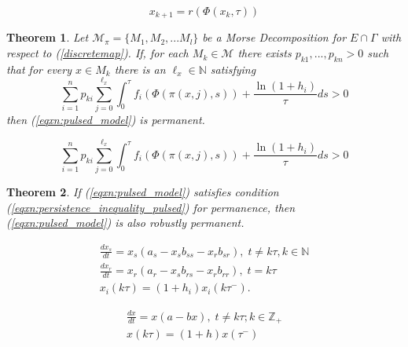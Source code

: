 \documentclass[10pt,a4paper]{amsart}
\newtheorem{theorem}{Theorem}
\newcommand{\N}{{\mathbb{N}}}
\newcommand{\Z}{{\mathbb{Z}}}
\begin{document}
\begin{equation}\label{discretemap}
x_{k+1}= r(\Phi(x_k, \tau))   
\end{equation}

\begin{theorem} \label{thm:main}
  Let $\mathcal{M}_\pi = \{M_1, M_2,... M_l\}$ be a Morse Decomposition for $E \cap \Gamma$ with respect to (\ref{discretemap}). If, for each $M_k\in \mathcal{M}$ there exists $p_{k1},..., p_{kn} > 0$ such that for every $x \in M_k$ there is an $\ell_x \in \mathbb{N}$ satisfying
    \begin{equation}\label{eqxn:persistence_inequality_pulsed}
        \sum^n_{i=1} p_{ki} \sum^{\ell_x}_{j=0} \int_0^\tau f_i(\Phi(\pi(x,j),s)) + \frac{\ln{(1+h_i)}}{\tau} ds > 0
    \end{equation}
    then (\ref{eqxn:pulsed_model}) is permanent.
\end{theorem}

    \begin{equation}
        \sum^n_{i=1} p_{ki} \sum^{\ell_x}_{j=0} \int_0^\tau f_i(\Phi(\pi(x,j),s)) + \frac{\ln{(1+h_i)}}{\tau} ds > 0
    \end{equation}

\begin{theorem} \label{thm:robust_permanence}
    If (\ref{eqxn:pulsed_model}) satisfies condition (\ref{eqxn:persistence_inequality_pulsed}) for permanence, then (\ref{eqxn:pulsed_model}) is also robustly permanent. 
\end{theorem}

\begin{equation}\label{eqxn:lv_cancer_model}
\begin{split}    
\frac{d x_s}{d t} = x_s(a_s - x_sb_{ss} - x_rb_{sr}), \; t \neq k\tau, k \in \N \\
\frac{dx_r}{dt} = x_r(a_r - x_sb_{rs} - x_rb_{rr}),  \; t = k\tau\\
x_i(k\tau)= (1 + h_i)x_i(k\tau^-). 
\end{split}
\end{equation}

    \begin{equation}\label{eqxn:lv_1d}
    \begin{split}
        \frac{dx}{dt} = x(a - b x), \; t \neq k\tau; k \in \Z_+ \\
        x(k\tau) = (1+h)x(\tau^-)
    \end{split}
    \end{equation}
\end{document}
